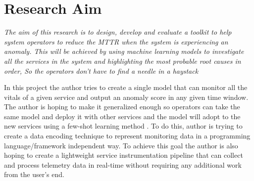 \section{Research Aim}

\textit{The aim of this research is to design, develop and evaluate a toolkit to help system operators to reduce the MTTR when the system is experiencing an anomaly. This will be achieved by using machine learning models to investigate all the services in the system and highlighting the most probable root causes in order, So the operators don’t have to find a needle in a haystack}

In this project the author tries to create a single model that can monitor all the vitals of a given service and output an anomaly score in any given time window. The author is hoping to make it generalized enough so operators can take the same model and deploy it with other services and the model will adopt to the new services using a few-shot learning method \citep{wang2020generalizing}. To do this, author is trying to create a data encoding technique to represent monitoring data in a programming language/framework independent way. To achieve this goal the author is also hoping to create a lightweight service instrumentation pipeline that can collect and process telemetry data in real-time without requiring any additional work from the user's end.
